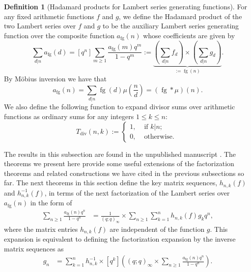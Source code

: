 \documentclass[12pt,reqno,a4letter]{article}
\numberwithin{figure}{section}
\numberwithin{table}{section}
\numberwithin{equation}{section}
\DeclareMathOperator{\fg}{fg}
\DeclareMathOperator{\Div}{div}
\theoremstyle{plain}
\numberwithin{theorem}{section}
\theoremstyle{definition}
\newtheorem{definition}[theorem]{Definition}
\begin{document}
\begin{definition}[Hadamard products for Lambert series generating functions] 
\label{def_HP_for_LSGFs}
For any fixed arithmetic functions $f$ and $g$, we define the Hadamard product of the 
two Lambert series over $f$ and $g$ to be the auxiliary Lambert series generating function 
over the composite function $a_{\fg}(n)$ whose coefficients are given by 
\[
\sum_{d|n} a_{\fg}(d) = [q^n] \sum_{m \geq 1} \frac{a_{\fg}(m) q^m}{1-q^m} := 
     \underset{:=\fg(n)}{\underbrace{\left(\sum_{d|n} f_d\right) \times \left(\sum_{d|n} g_d\right)}}. 
\] 
By M\"obius inversion we have that 
\[
a_{\fg}(n) = \sum_{d|n} \fg(d) \mu\left(\frac{n}{d}\right) = (\fg \ast \mu)(n). 
\] 
We also define the following function to expand divisor sums over arithmetic functions as 
ordinary sums for any integers $1 \leq k \leq n$: 
\[
T_{\Div}(n, k) := 
     \begin{cases} 
     1, & \text{ if $k|n$; } \\ 
     0, & \text{ otherwise. }
     \end{cases} 
\]
\end{definition} 

The results in this subsection are found in the unpublished manuscript \cite{MDS-HADAMARD-FACTTHMS}. 
The theorems we present here provide some useful extensions of the factorization theorems and 
related constructions we have cited in the previous subsections so far. 
The next theorems in this section define the key matrix sequences, 
$h_{n,k}(f)$ and $h_{n,k}^{-1}(f)$, in terms of the 
next factorization of the Lambert series over $a_{\fg}(n)$ in the form of 
\begin{align} 
\label{eqn_HPFactGenExp} 
\sum_{n \geq 1} \frac{a_{\fg}(n) q^n}{1-q^n} & = \frac{1}{(q; q)_{\infty}} \times \sum_{n \geq 1} 
     \sum_{k=1}^n h_{n,k}(f) g_k q^n, 
\end{align} 
where the matrix entries $h_{n,k}(f)$ are independent of the function $g$. This expansion 
is equivalent to defining the factorization expansion by the inverse matrix sequences as 
\begin{align} 
\label{eqn_HPFactGenExp_v2} 
g_n & = \sum_{k=1}^n h_{n,k}^{-1} \times 
     [q^k] \left((q; q)_{\infty} \times \sum_{n \geq 1} \frac{a_{\fg}(n) q^n}{1-q^n}\right). 
\end{align} 
\end{document}
